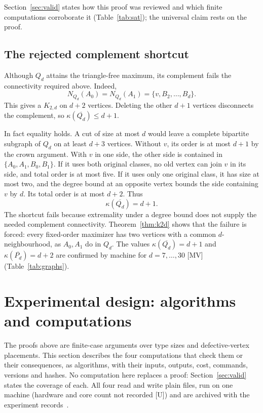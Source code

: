 \documentclass[11pt]{article}
\theoremstyle{remark}
\begin{document}
Section~\ref{sec:valid} states how this proof was reviewed and which finite computations corroborate it (Table~\ref{tab:sat}); the universal claim rests on the proof.

\subsection{The rejected complement shortcut}
Although $Q_d$ attains the triangle-free maximum, its complement fails the connectivity required above. Indeed,
\begin{equation}
N_{Q_d}(A_0)=N_{Q_d}(A_1)=\{v,B_2,\ldots,B_d\}.
\end{equation}
This gives a $K_{2,d}$ on $d+2$ vertices. Deleting the other $d+1$ vertices disconnects the complement, so $\kappa(\overline{Q_d})\le d+1$.

In fact equality holds. A cut of size at most $d$ would leave a complete bipartite subgraph of $Q_d$ on at least $d+3$ vertices. Without $v$, its order is at most $d+1$ by the crown argument. With $v$ in one side, the other side is contained in $\{A_0,A_1,B_0,B_1\}$. If it uses both original classes, no old vertex can join $v$ in its side, and total order is at most five. If it uses only one original class, it has size at most two, and the degree bound at an opposite vertex bounds the side containing $v$ by $d$. Its total order is at most $d+2$. Thus
\begin{equation}
\kappa(\overline{Q_d})=d+1.
\end{equation}
The shortcut fails because extremality under a degree bound does not supply the needed complement connectivity. Theorem~\ref{thm:k2d} shows that the failure is forced: every fixed-order maximizer has two vertices with a common $d$-neighbourhood, as $A_0,A_1$ do in $Q_d$. The values $\kappa(\overline{Q_d})=d+1$ and $\kappa(\overline{P_d})=d+2$ are confirmed by machine for $d=7,\ldots,30$ [MV] (Table~\ref{tab:graphs}).

\section{Experimental design: algorithms and computations}\label{sec:comp}

The proofs above are finite-case arguments over type sizes and defective-vertex placements. This section describes the four computations that check them or their consequences, as algorithms, with their inputs, outputs, cost, commands, versions and hashes. No computation here replaces a proof: Section~\ref{sec:valid} states the coverage of each. All four read and write plain files, run on one machine (hardware and core count not recorded [U]) and are archived with the experiment records~\cite{Record,Record4}.
\end{document}
